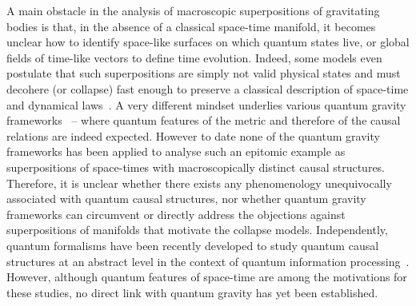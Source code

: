 \documentclass[a4paper,11pt]{article}
\newcommand{\red}[1]{\textcolor{red}{#1}}
\begin{document}
A main obstacle in the analysis of macroscopic superpositions of gravitating bodies is that, in the absence of a classical space-time manifold, it becomes unclear how to identify space-like surfaces on which quantum states live, or global fields of time-like vectors to define time evolution. Indeed, some models even postulate that such superpositions are simply not valid physical states and must decohere (or collapse) fast enough to preserve a classical description of space-time and dynamical laws~\cite{ref:Karolyhazy1966, ref:Diosi1989, ref:Penrose1996, Stamp:2012, Penrose2014}.
A very different mindset underlies various quantum gravity frameworks~\cite{kiefer2012quantum} -- where quantum features of the metric and therefore of the causal relations are indeed expected. However to date none of the quantum gravity frameworks has been applied to analyse such an epitomic example as  superpositions of space-times with macroscopically distinct causal structures. Therefore, it is unclear whether there exists any phenomenology unequivocally associated with quantum causal structures, nor whether quantum gravity frameworks can  circumvent or directly  address the objections against superpositions of manifolds that motivate the collapse models.
%
Independently, quantum formalisms have been recently developed to study quantum causal structures at an abstract level in the context of quantum information processing~\cite{Hardy:2007bk, Chiribella:2013, Oreshkov:2012}. However, although quantum features of space-time are among the motivations for these studies, no direct link with quantum gravity has yet been established.
\end{document}
